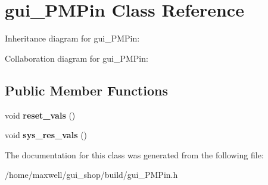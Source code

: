 \hypertarget{classgui__PMPin}{}\section{gui\+\_\+\+P\+M\+Pin Class Reference}
\label{classgui__PMPin}


Inheritance diagram for gui\+\_\+\+P\+M\+Pin\+:


Collaboration diagram for gui\+\_\+\+P\+M\+Pin\+:
\subsection*{Public Member Functions}
\begin{DoxyCompactItemize}
\item 
void {\bfseries reset\+\_\+vals} ()\hypertarget{classgui__PMPin_acb6cd63b4650c93e8b434f1ea4303b6a}{}\label{classgui__PMPin_acb6cd63b4650c93e8b434f1ea4303b6a}

\item 
void {\bfseries sys\+\_\+res\+\_\+vals} ()\hypertarget{classgui__PMPin_a2299d588ef47427299d899e71edd5268}{}\label{classgui__PMPin_a2299d588ef47427299d899e71edd5268}

\end{DoxyCompactItemize}


The documentation for this class was generated from the following file\+:\begin{DoxyCompactItemize}
\item 
/home/maxwell/gui\+\_\+shop/build/gui\+\_\+\+P\+M\+Pin.\+h\end{DoxyCompactItemize}
